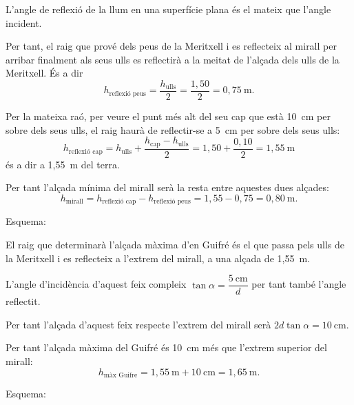 \begin{solapartat}
 L'angle de reflexió de la llum en una superfície plana és el mateix que l'angle incident.

 Per tant, el raig que prové dels peus de la Meritxell i es reflecteix al mirall per arribar finalment als seus ulls es reflectirà a la meitat de l'alçada dels ulls de la Meritxell. És a dir
\[ h_\text{reflexió peus} = \frac{h_\text{ulls}}{2} = \frac{1,50}{2} = 0,75\ \mathrm{m}. \]

 Per la mateixa raó, per veure el punt més alt del seu cap que està 10~cm per sobre dels seus ulls, el raig haurà de reflectir-se a 5~cm per sobre dels seus ulls:
\[ h_\text{reflexió cap} = h_\text{ulls} + \frac{h_\text{cap} - h_\text{ulls}}{2} = 1,50 + \frac{0,10}{2} = 1,55\ \mathrm{m} \]
és a dir a 1,55~m del terra.

 Per tant l'alçada mínima del mirall serà la resta entre aquestes dues alçades:
\[ h_\text{mirall} = h_\text{reflexió cap} - h_\text{reflexió peus} = 1,55 - 0,75 = 0,80\ \mathrm{m}. \]

 Esquema:
\end{solapartat}

\begin{solapartat}
 El raig que determinarà l'alçada màxima d'en Guifré és el que passa pels ulls de la Meritxell i es reflecteix a l'extrem del mirall, a una alçada de 1,55~m.

 L'angle d'incidència d'aquest feix compleix $\tan\alpha = \dfrac{5\ \mathrm{cm}}{d}$ per tant també l'angle reflectit.

 Per tant l'alçada d'aquest feix respecte l'extrem del mirall serà $2d\tan\alpha = 10\ \mathrm{cm}$.

 Per tant l'alçada màxima del Guifré és 10~cm més que l'extrem superior del mirall:
\[ h_\text{màx Guifre} = 1,55\ \mathrm{m} + 10\ \mathrm{cm} = 1,65\ \mathrm{m}. \]

 Esquema:
\end{solapartat}
